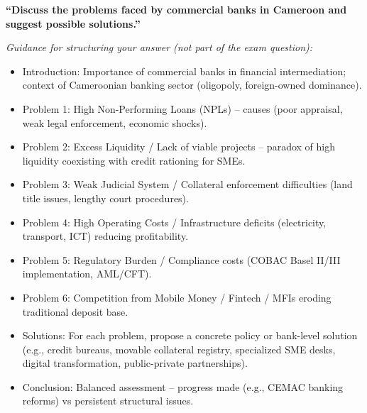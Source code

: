 \documentclass[11pt]{article}
\begin{document}
\begin{exercice}
\textbf{``Discuss the problems faced by commercial banks in Cameroon and suggest possible solutions.''}

\textit{Guidance for structuring your answer (not part of the exam question):}
\begin{itemize}
\item Introduction: Importance of commercial banks in financial intermediation; context of Cameroonian banking sector (oligopoly, foreign-owned dominance).
\item Problem 1: High Non-Performing Loans (NPLs) -- causes (poor appraisal, weak legal enforcement, economic shocks).
\item Problem 2: Excess Liquidity / Lack of viable projects -- paradox of high liquidity coexisting with credit rationing for SMEs.
\item Problem 3: Weak Judicial System / Collateral enforcement difficulties (land title issues, lengthy court procedures).
\item Problem 4: High Operating Costs / Infrastructure deficits (electricity, transport, ICT) reducing profitability.
\item Problem 5: Regulatory Burden / Compliance costs (COBAC Basel II/III implementation, AML/CFT).
\item Problem 6: Competition from Mobile Money / Fintech / MFIs eroding traditional deposit base.
\item Solutions: For each problem, propose a concrete policy or bank-level solution (e.g., credit bureaus, movable collateral registry, specialized SME desks, digital transformation, public-private partnerships).
\item Conclusion: Balanced assessment -- progress made (e.g., CEMAC banking reforms) vs persistent structural issues.
\end{itemize}
\end{exercice}
\end{document}
